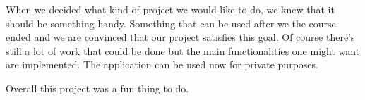 \documentclass{report}
\begin{document}
When we decided what kind of project we would like to do, we knew that it should be something handy. Something that can be used after we the course ended and we are convinced that our project satisfies this goal. Of course there's still a lot of work that could be done but the main functionalities one might want are implemented. The application can be used now for private purposes.

Overall this project was a fun thing to do. 



\end{document}
